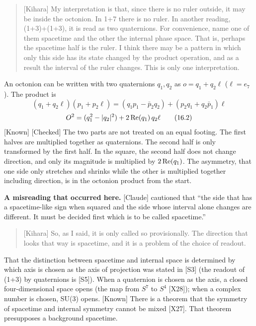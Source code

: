 \documentclass[
  a4paper,
]{article}
\begin{document}
\begin{quote}
{[}Kihara{]} My interpretation is that, since there is no ruler outside,
it may be inside the octonion. In 1+7 there is no ruler. In another
reading, (1+3)+(1+3), it is read as two quaternions. For convenience,
name one of them spacetime and the other the internal phase space. That
is, perhaps the spacetime half is the ruler. I think there may be a
pattern in which only this side has its state changed by the product
operation, and as a result the interval of the ruler changes. This is
only one interpretation.
\end{quote}

An octonion can be written with two quaternions \(q_1, q_2\) as
\(o = q_1 + q_2\ell\) (\(\ell = e_7\)). The product is \[
(q_1 + q_2\ell)(p_1 + p_2\ell) = (q_1p_1 - \bar p_2q_2) + (p_2q_1 + q_2\bar p_1)\ell \tag{16.1}
\] \[
O^2 = (q_1^2 - \lvert q_2\rvert^2) + 2\,{\rm Re}(q_1)\,q_2\ell \tag{16.2}
\] {[}Known{]} {[}Checked{]} The two parts are not treated on an equal
footing. The first halves are multiplied together as quaternions. The
second half is only transformed by the first half. In the square, the
second half does not change direction, and only its magnitude is
multiplied by \(2\,{\rm Re}(q_1)\). The asymmetry, that one side only
stretches and shrinks while the other is multiplied together including
direction, is in the octonion product from the start.

\textbf{A misreading that occurred here.} {[}Claude{]} cautioned that
``the side that has a spacetime-like sign when squared and the side
whose interval alone changes are different. It must be decided first
which is to be called spacetime.''

\begin{quote}
{[}Kihara{]} So, as I said, it is only called so provisionally. The
direction that looks that way is spacetime, and it is a problem of the
choice of readout.
\end{quote}

That the distinction between spacetime and internal space is determined
by which axis is chosen as the axis of projection was stated in {[}S3{]}
(the readout of (1+3) by quaternions is {[}S5{]}). When a quaternion is
chosen as the axis, a closed four-dimensional space opens (the map from
\(S^7\) to \(S^4\) {[}X28{]}); when a complex number is chosen, SU(3)
opens. {[}Known{]} There is a theorem that the symmetry of spacetime and
internal symmetry cannot be mixed {[}X27{]}. That theorem presupposes a
background spacetime.
\end{document}
